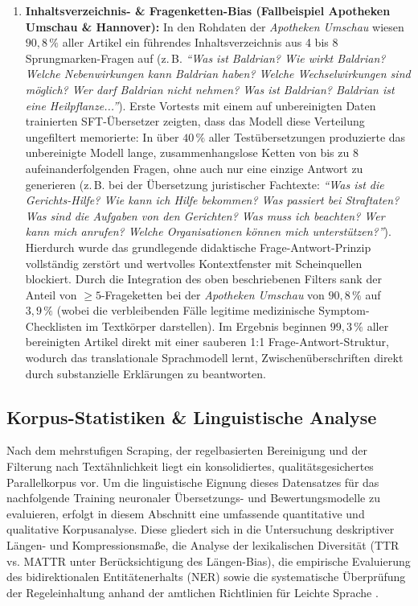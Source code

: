 \begin{enumerate}
    \item \textbf{Inhaltsverzeichnis- \& Fragenketten-Bias (Fallbeispiel Apotheken Umschau \& Hannover):} In den Rohdaten der \textit{Apotheken Umschau} wiesen $90{,}8\,\%$ aller Artikel ein führendes Inhaltsverzeichnis aus 4 bis 8 Sprungmarken-Fragen auf (z.\,B. \textit{\enquote{Was ist Baldrian? Wie wirkt Baldrian? Welche Nebenwirkungen kann Baldrian haben? Welche Wechselwirkungen sind möglich? Wer darf Baldrian nicht nehmen? Was ist Baldrian? Baldrian ist eine Heilpflanze...}}). Erste Vortests mit einem auf unbereinigten Daten trainierten SFT-Übersetzer zeigten, dass das Modell diese Verteilung ungefiltert memorierte: In über $40\,\%$ aller Testübersetzungen produzierte das unbereinigte Modell lange, zusammenhangslose Ketten von bis zu 8 aufeinanderfolgenden Fragen, ohne auch nur eine einzige Antwort zu generieren (z.\,B. bei der Übersetzung juristischer Fachtexte: \textit{\enquote{Was ist die Gerichts-Hilfe? Wie kann ich Hilfe bekommen? Was passiert bei Straftaten? Was sind die Aufgaben von den Gerichten? Was muss ich beachten? Wer kann mich anrufen? Welche Organisationen können mich unterstützen?}}). Hierdurch wurde das grundlegende didaktische Frage-Antwort-Prinzip vollständig zerstört und wertvolles Kontextfenster mit Scheinquellen blockiert. Durch die Integration des oben beschriebenen Filters sank der Anteil von $\ge 5$-Frageketten bei der \textit{Apotheken Umschau} von $90{,}8\,\%$ auf $3{,}9\,\%$ (wobei die verbleibenden Fälle legitime medizinische Symptom-Checklisten im Textkörper darstellen). Im Ergebnis beginnen $99{,}3\,\%$ aller bereinigten Artikel direkt mit einer sauberen 1:1 Frage-Antwort-Struktur, wodurch das translationale Sprachmodell lernt, Zwischenüberschriften direkt durch substanzielle Erklärungen zu beantworten.
\end{enumerate}

\subsection{Korpus-Statistiken \& Linguistische Analyse}
\label{sec:korpus_statistiken_diversitaet}

Nach dem mehrstufigen Scraping, der regelbasierten Bereinigung und der Filterung nach Textähnlichkeit liegt ein konsolidiertes, qualitätsgesichertes Parallelkorpus vor. Um die linguistische Eignung dieses Datensatzes für das nachfolgende Training neuronaler Übersetzungs- und Bewertungsmodelle zu evaluieren, erfolgt in diesem Abschnitt eine umfassende quantitative und qualitative Korpusanalyse. Diese gliedert sich in die Untersuchung deskriptiver Längen- und Kompressionsmaße, die Analyse der lexikalischen Diversität (TTR vs. MATTR unter Berücksichtigung des Längen-Bias), die empirische Evaluierung des bidirektionalen Entitätenerhalts (NER) sowie die systematische Überprüfung der Regeleinhaltung anhand der amtlichen Richtlinien für Leichte Sprache \citep{bmas2025ratgeber, bund2026barrierefreiheit, din8581}.

